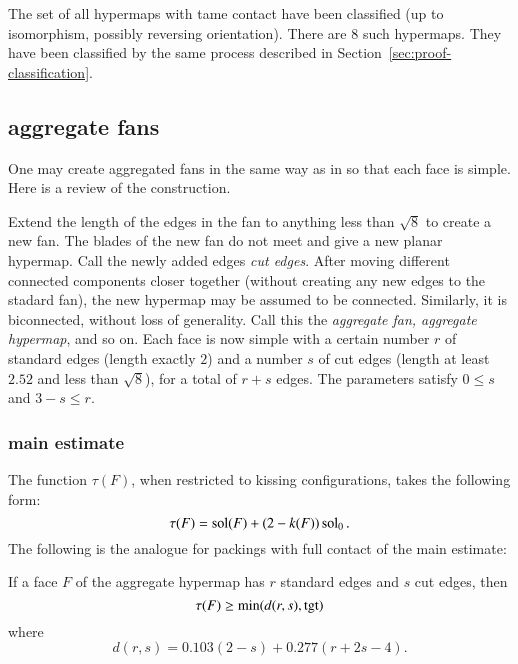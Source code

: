 The set of all hypermaps with tame contact have been classified (up to isomorphism, possibly reversing orientation).  There are $8$ such hypermaps.  They have been classified by the same process described in Section~\ref{sec:proof-classification}.
%
%
%


\subsection{aggregate fans}

One may create aggregated fans in the same way as in \cite{Hales:2006:DCG} so that each face is simple.  Here is a review of the construction.
%
%

Extend the length of the edges in the fan to anything less than  $\sqrt8$ to create a new fan.  The blades of the new fan do not meet and give a new planar hypermap.  Call the newly added edges {\it cut edges}.  After moving different connected components closer together (without creating any new edges to the stadard fan),  the new hypermap may be assumed to be connected.  Similarly, it is biconnected, without loss of generality.  Call this the {\it aggregate fan, aggregate hypermap}, and so on.   Each face is now simple with a certain number $r$ of standard edges (length exactly $2$) and a number $s$ of cut edges (length at least $2.52$ and less than $\sqrt8$), for a total of $r+s$ edges.  
The parameters satisfy $0\le s$ and $3-s \le r$.
%
%


\subsubsection{main estimate}

The function $\tau(F)$, when restricted to kissing configurations, takes the following form:
$$
\tau(F) = \operatorname{sol}(F) + (2-k(F)) \operatorname{sol}_0.
$$
%
%
The following is the analogue for packings with full contact of the main estimate:

\begin{theorem}\label{lemma:main-estimate-12}  If a face $F$ of the aggregate hypermap has $r$ standard edges and $s$ cut edges, then 
$$\tau(F) \ge \min(d(r,s),{\operatorname{tgt}})$$
where 
$$
d(r,s) = 0.103 (2-s) + 0.277 (r+2s-4).
$$
\end{theorem}

